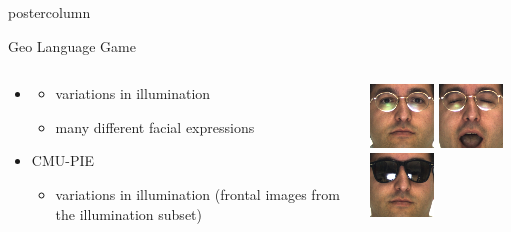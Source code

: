 \documentclass[final,hyperref={pdfpagelabels=false}]{beamer}
\begin{document}
\begin{frame}
\begin{columns}
\begin{column}{.33\textwidth}
\begin{beamercolorbox}[center,wd=\textwidth]{postercolumn}
\begin{minipage}[T]{.95\textwidth}
{            \begin{block}{Geo Language Game}
              \begin{columns}
                \begin{column}{.6\textwidth}
                  \begin{itemize}
                  \item
                    \begin{itemize}
                    \item variations in illumination
                    \item many different facial expressions
                    \end{itemize}
                  \item CMU-PIE
                    \begin{itemize}
                    \item variations in illumination (frontal images from the illumination subset)
                    \end{itemize}
                  \end{itemize}
                \end{column}
                \begin{column}{.39\textwidth}
                  \includegraphics[width=0.22\linewidth]{hanselmann-databases/arface/train/png/occlusions/arneutral/m-016-1}
                  \-
                  \includegraphics[width=0.22\linewidth]{hanselmann-databases/arface/train/png/cropped/m-016-4}
                  \-
                  \includegraphics[width=0.22\linewidth]{hanselmann-databases/arface/test/png/occlusions/ar1sun/m-016-8}

\end{column}
\end{columns}
\end{block}}
\end{minipage}
\end{beamercolorbox}
\end{column}
\end{columns}
\end{frame}
\end{document}
